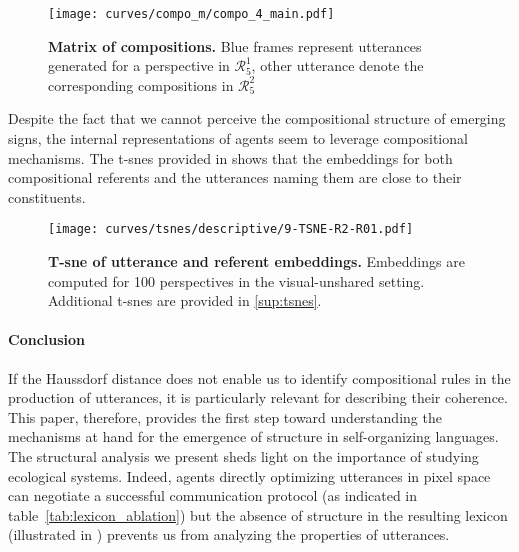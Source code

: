 \begin{figure}[!h]
\centering
\texttt{[image: curves/compo\_m/compo\_4\_main.pdf]}
\caption{\textbf{Matrix of compositions. }Blue frames represent utterances generated for a perspective in $\mathcal{R}_5^1$, other utterance denote the corresponding compositions in $\mathcal{R}_5^2$ }
\label{fig:compo_matrix}
\end{figure}

Despite the fact that we cannot perceive the compositional structure of emerging signs, the internal representations of agents seem to leverage compositional mechanisms. The t-snes provided in  shows that the embeddings for both compositional referents and the utterances naming them are close to their constituents. 
\begin{figure}[!h]
    \centering
    \texttt{[image: curves/tsnes/descriptive/9-TSNE-R2-R01.pdf]}
    \caption{\textbf{T-sne of utterance and referent embeddings.} Embeddings are computed for 100 perspectives in the visual-unshared setting. Additional t-snes are provided in \ap\ref{sup:tsnes}.}
    \label{fig:tsne}
\end{figure}

\paragraph{Conclusion} If the Haussdorf distance does not enable us to identify compositional rules in the production of utterances, it is particularly relevant for describing their coherence. This paper, therefore, provides the first step toward understanding the mechanisms at hand for the emergence of structure in self-organizing languages. The structural analysis we present sheds light on the importance of studying ecological systems. 
Indeed, agents directly optimizing utterances in pixel space can negotiate a successful communication protocol (as indicated in table~\ref{tab:lexicon_ablation}) but the absence of structure in the resulting lexicon (illustrated in ) prevents us from analyzing the properties of utterances. 

